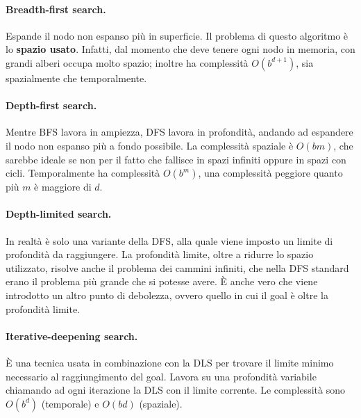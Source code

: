 \documentclass[a4paper, 11pt]{article}
\begin{document}
\paragraph{Breadth-first search.} Espande il nodo non espanso più in superficie. Il problema di questo algoritmo è lo \textbf{spazio usato}. Infatti, dal momento che deve tenere ogni nodo in memoria, con grandi alberi occupa molto spazio; inoltre ha complessità $O(b^{d+1})$, sia spazialmente che temporalmente.

\paragraph{Depth-first search.} Mentre BFS lavora in ampiezza, DFS lavora in profondità, andando ad espandere il nodo non espanso più a fondo possibile. La complessità spaziale è $O(bm)$, che sarebbe ideale se non per il fatto che fallisce in spazi infiniti oppure in spazi con cicli. Temporalmente ha complessità $O(b^m)$, una complessità peggiore quanto più $m$ è maggiore di $d$.

\paragraph{Depth-limited search.} In realtà è solo una variante della DFS, alla quale viene imposto un limite di profondità da raggiungere. La profondità limite, oltre a ridurre lo spazio utilizzato, risolve anche il problema dei cammini infiniti, che nella DFS standard erano il problema più grande che si potesse avere. È anche vero che viene introdotto un altro punto di debolezza, ovvero quello in cui il goal è oltre la profondità limite.

\paragraph{Iterative-deepening search.} È una tecnica usata in combinazione con la DLS per trovare il limite minimo necessario al raggiungimento del goal. Lavora su una profondità variabile chiamando ad ogni iterazione la DLS con il limite corrente. Le complessità sono $O(b^d)$ (temporale) e $O(bd)$ (spaziale).
\end{document}
